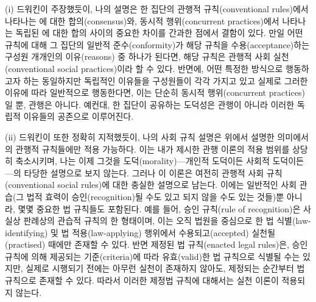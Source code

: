 (i) 드워킨이 주장했듯이, 나의 설명은 한 집단의 관행적 규칙(conventional 
rules)에서 나타나는 에 대한 합의(consensus)와,
동시적 행위(concurrent practices)에서 나타나는 독립된
에 대한 합의 사이의 중요한 차이를 간과한 점에서
결함이 있다. 만일 어떤 규칙에 대해 그 집단의 일반적 준수(conformity)가
해당 규칙을 수용(acceptance)하는 구성원 개개인의 이유(reasons) 중
하나가 된다면, 해당 규칙은 관행적 사회 실천(conventional social
practices)이라 할 수 있다. 반면에, 어떤 특정한 방식으로 행동하고자
하는 동일하지만 독립적인 이유들을 구성원들이 각각 가지고 있고 실제로
그러한 이유에 따라 일반적으로 행동한다면, 이는 단순히 동시적
행위(concurrent practices)일 뿐, 관행은 아니다. 예컨대, 한 집단이
공유하는 도덕성은 관행이 아니라 이러한 독립적 이유들의 공존으로
이루어진다.

(ii) 드워킨이 또한 정확히 지적했듯이, 나의 사회 규칙 설명은 위에서 설명한
의미에서의 관행적 규칙들에만 적용 가능하다. 이는 내가 제시한 관행
이론의 적용 범위를 상당히 축소시키며, 나는 이제 그것을
도덕(morality)---개인적 도덕이든 사회적 도덕이든---의 타당한 설명으로
보지 않는다. 그러나 이 이론은 여전히 관행적 사회 규칙(conventional
social rules)에 대한 충실한 설명으로 남는다. 이에는 일반적인 사회
관습(그 법적 효력이 승인(recognition)될 수도 있고 되지 않을 수도 있는
것들)뿐 아니라, 몇몇 중요한 법 규칙들도 포함된다. 예를 들어, 승인
규칙(rule of recognition)은 사실상 판례상의 관습적 규칙의 한 형태이며,
이는 오직 법원을 중심으로 한 법 식별(law-identifying) 및 법
적용(law-applying) 행위에서 수용되고(accepted) 실천될(practised)
때에만 존재할 수 있다. 반면 제정된 법 규칙(enacted legal rules)은,
승인 규칙에 의해 제공되는 기준(criteria)에 따라 유효(valid)한 법
규칙으로 식별될 수는 있지만, 실제로 시행되기 전에는 아무런 실천이
존재하지 않아도, 제정되는 순간부터 법 규칙으로 존재할 수 있다. 따라서
  이러한 제정법 규칙에 대해서는 실천 이론이 적용되지 않는다.

